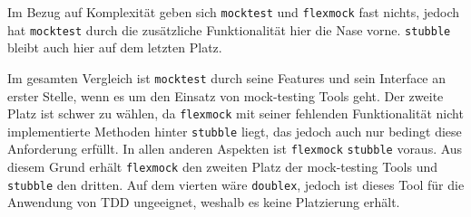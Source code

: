 Im Bezug auf Komplexität geben sich \lstinline{mocktest} und
\lstinline{flexmock} fast nichts, jedoch hat \lstinline{mocktest} durch die
zusätzliche Funktionalität hier die Nase vorne. \lstinline{stubble} bleibt auch
hier auf dem letzten Platz.
\newline

Im gesamten Vergleich ist \lstinline{mocktest} durch seine Features und sein
Interface an erster Stelle, wenn es um den Einsatz von \gls{mock}-testing Tools
geht. Der zweite Platz ist schwer zu wählen, da \lstinline{flexmock} mit seiner
fehlenden Funktionalität nicht implementierte Methoden hinter
\lstinline{stubble} liegt, das jedoch auch nur bedingt diese Anforderung
erfüllt. In allen anderen Aspekten ist \lstinline{flexmock} \lstinline{stubble}
voraus. Aus diesem Grund erhält \lstinline{flexmock} den zweiten Platz der
\gls{mock}-testing Tools und \lstinline{stubble} den dritten. Auf dem vierten
wäre \lstinline{doublex}, jedoch ist dieses Tool für die Anwendung von TDD
ungeeignet, weshalb es keine Platzierung erhält.